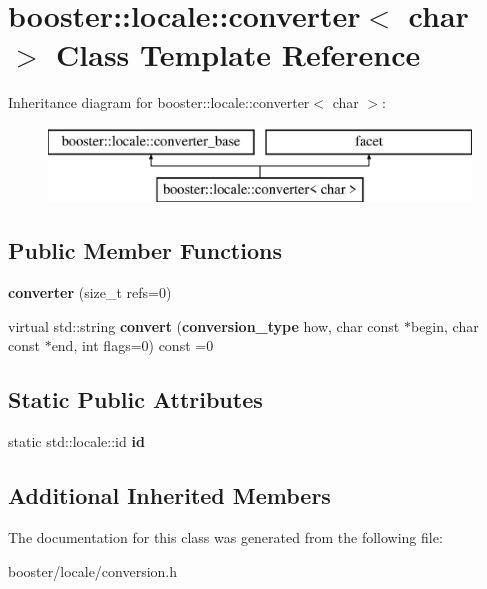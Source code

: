 \section{booster\+:\+:locale\+:\+:converter$<$ char $>$ Class Template Reference}
\label{classbooster_1_1locale_1_1converter_3_01char_01_4}
Inheritance diagram for booster\+:\+:locale\+:\+:converter$<$ char $>$\+:\begin{figure}[H]
\begin{center}
\leavevmode
\includegraphics[height=2.000000cm]{classbooster_1_1locale_1_1converter_3_01char_01_4}
\end{center}
\end{figure}
\subsection*{Public Member Functions}
\begin{DoxyCompactItemize}
\item 
{\bfseries converter} (size\+\_\+t refs=0)\label{classbooster_1_1locale_1_1converter_3_01char_01_4_a0fe9bcea296deda0ed9217b09de2a862}

\item 
virtual std\+::string {\bfseries convert} ({\bf conversion\+\_\+type} how, char const $\ast$begin, char const $\ast$end, int flags=0) const =0\label{classbooster_1_1locale_1_1converter_3_01char_01_4_a5ef2642c11c137cb9d93368ae76b5792}

\end{DoxyCompactItemize}
\subsection*{Static Public Attributes}
\begin{DoxyCompactItemize}
\item 
static std\+::locale\+::id {\bfseries id}\label{classbooster_1_1locale_1_1converter_3_01char_01_4_a5a14a4e6600b6eae8b7ff2ea01b16a94}

\end{DoxyCompactItemize}
\subsection*{Additional Inherited Members}


The documentation for this class was generated from the following file\+:\begin{DoxyCompactItemize}
\item 
booster/locale/conversion.\+h\end{DoxyCompactItemize}
